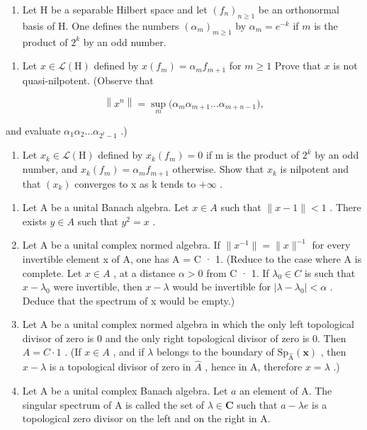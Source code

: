 \begin{enumerate}
\def\labelenumi{¶ \arabic{enumi})}
\setcounter{enumi}{11}
\tightlist
\item
  Let H be a separable Hilbert space and let \((f_n)_{n \geqslant 1}\) be an orthonormal basis of H. One defines the numbers \((\alpha_m)_{m \geqslant 1}\) by \(\alpha_m = e^{-k}\) if \(m\) is the product of \(2^k\) by an odd number.
\end{enumerate}

\begin{enumerate}
\def\labelenumi{\alph{enumi})}
\tightlist
\item
  Let \(x \in \mathcal{L}(\mathrm{H})\) defined by \(x(f_m) = \alpha_m f_{m+1}\) for \(m \geqslant 1\) Prove that \(x\) is not quasi-nilpotent. (Observe that
\end{enumerate}

\[
\left\| x ^ {n} \right\| = \sup _ {m} \bigl (\alpha_ {m} \alpha_ {m + 1} \dots \alpha_ {m + n - 1} \bigr),
\]

and evaluate \(\alpha_{1}\alpha_{2}\ldots\alpha_{2^{t}-1}\) .)

\begin{enumerate}
\def\labelenumi{\alph{enumi})}
\setcounter{enumi}{1}
\tightlist
\item
  Let \(x_{k} \in \mathcal{L}(\mathrm{H})\) defined by \(x_{k}(f_{m}) = 0\) if m is the product of \(2^{k}\) by an odd number, and \(x_{k}(f_{m}) = \alpha_{m} f_{m+1}\) otherwise. Show that \(x_{k}\) is nilpotent and that \((x_{k})\) converges to x as k tends to \(+\infty\) .
\end{enumerate}

\begin{enumerate}
\def\labelenumi{\arabic{enumi})}
\setcounter{enumi}{12}
\item
  Let A be a unital Banach algebra. Let \(x \in A\) such that \(\|x - 1\| < 1\) . There exists \(y \in A\) such that \(y^{2} = x\) .
\item
  Let A be a unital complex normed algebra. If \(\|x^{-1}\| = \|x\|^{-1}\) for every invertible element x of A, one has A = C · 1. (Reduce to the case where A is complete. Let \(x \in A\) , at a distance \(\alpha > 0\) from C · 1. If \(\lambda_{0} \in C\) is such that \(x - \lambda_{0}\) were invertible, then \(x - \lambda\) would be invertible for \(|\lambda - \lambda_{0}| < \alpha\) . Deduce that the spectrum of x would be empty.)
\item
  Let A be a unital complex normed algebra in which the only left topological divisor of zero is 0 and the only right topological divisor of zero is 0. Then \(A = C \cdot 1\) . (If \(x \in A\) , and if \(\lambda\) belongs to the boundary of \(\mathrm{Sp}_{\widehat{\mathrm{A}}}(\boldsymbol{x})\) , then \(x - \lambda\) is a topological divisor of zero in \(\widehat{A}\) , hence in A, therefore \(x = \lambda\) .)
\item
  Let A be a unital complex Banach algebra. Let \(a\) an element of A. The singular spectrum of A is called the set of \(\lambda \in \mathbf{C}\) such that \(a - \lambda e\) is a topological zero divisor on the left and on the right in A.
\end{enumerate}


